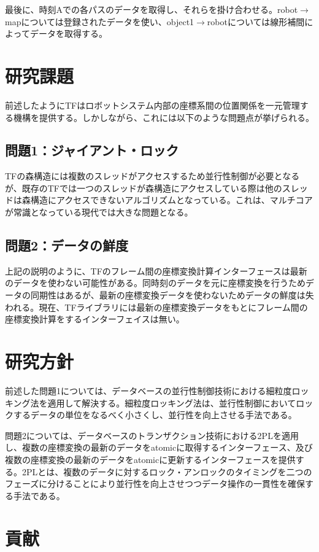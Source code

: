 \documentclass[a4paper]{jreport}	%
\begin{document}
最後に、時刻Aでの各パスのデータを取得し、それらを掛け合わせる。robot$\rightarrow$mapについては登録されたデータを使い、object1$\rightarrow$robotについては線形補間によってデータを取得する。

\section{研究課題}
前述したようにTFはロボットシステム内部の座標系間の位置関係を一元管理する機構を提供する。しかしながら、これには以下のような問題点が挙げられる。

\subsection*{問題1：ジャイアント・ロック}
TFの森構造には複数のスレッドがアクセスするため並行性制御が必要となるが、既存のTFでは一つのスレッドが森構造にアクセスしている際は他のスレッドは森構造にアクセスできないアルゴリズムとなっている。これは、マルチコアが常識となっている現代では大きな問題となる。

\subsection*{問題2：データの鮮度}

上記の説明のように、TFのフレーム間の座標変換計算インターフェースは最新のデータを使わない可能性がある。同時刻のデータを元に座標変換を行うためデータの同期性はあるが、最新の座標変換データを使わないためデータの鮮度は失われる。現在、TFライブラリには最新の座標変換データをもとにフレーム間の座標変換計算をするインターフェイスは無い。

\section{研究方針}
前述した問題1については、データベースの並行性制御技術における細粒度ロッキング法を適用して解決する。細粒度ロッキング法は、並行性制御においてロックするデータの単位をなるべく小さくし、並行性を向上させる手法である。

問題2については、データベースのトランザクション技術における2PLを適用し、複数の座標変換の最新のデータをatomicに取得するインターフェース、及び複数の座標変換の最新のデータをatomicに更新するインターフェースを提供する。2PLとは、複数のデータに対するロック・アンロックのタイミングを二つのフェーズに分けることにより並行性を向上させつつデータ操作の一貫性を確保する手法である。

\section{貢献}
\end{document}

